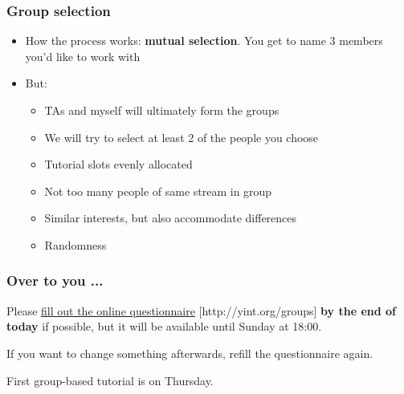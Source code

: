 \begin{frame}\frametitle{Group selection}
	\begin{itemize}
		\item	How the process works: \textbf{mutual selection}. You get to name 3 members you'd like to work with
		\item	But:
		\begin{itemize}
			\item	TAs and myself will ultimately form the groups
			\item	We will try to select at least 2 of the people you choose
			\item	Tutorial slots evenly allocated
			\item	Not too many people of same stream in group
			\item	Similar interests, but also accommodate differences
			\item	Randomness
		\end{itemize}
	\end{itemize}
\end{frame}

\begin{frame}\frametitle{Over to you ...}
	Please \href{http://yint.org/groups}{fill out the online questionnaire} [http://yint.org/groups] \textbf{by the end of today} if possible, but it will be available until Sunday at 18:00.

	\vspace{12pt}
	If you want to change something afterwards, refill the questionnaire again.

	\vspace{12pt}
	First group-based tutorial is on Thursday.
\end{frame}
